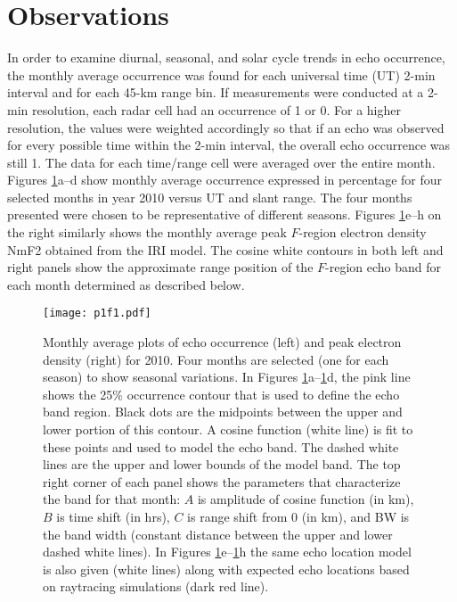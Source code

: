 \section{Observations}
\label{Sec:Obs}

In order to examine diurnal, seasonal, and solar cycle trends in echo occurrence, the monthly average occurrence was found for each universal time (UT) 2-min interval and for each 45-km range bin. If measurements were conducted at a 2-min resolution, each radar cell had an occurrence of 1 or 0. For a higher resolution, the values were weighted accordingly so that if an echo was observed for every possible time within the 2-min interval, the overall echo occurrence was still 1. The data for each time/range cell were averaged over the entire month. Figures \ref{fig:month_avg_occ}a--d show monthly average occurrence expressed in percentage for four selected months in year 2010 versus UT and slant range. The four months presented were chosen to be representative of different seasons. Figures \ref{fig:month_avg_occ}e--h on the right similarly shows the monthly average peak \(F\)-region electron density NmF2 obtained from the IRI model. The cosine white contours in both left and right panels show the approximate range position of the \(F\)-region echo band for each month determined as described below.
	
\begin{figure}
\texttt{[image: p1f1.pdf]}
\caption{Monthly average plots of echo occurrence (left) and peak electron density (right) for 2010.  Four months are selected (one for each season) to show seasonal variations. In Figures \ref{fig:month_avg_occ}a--\ref{fig:month_avg_occ}d,  the pink line shows the 25\% occurrence contour that is used to define the echo band region. Black dots are the midpoints between the upper and lower portion of this contour.  A cosine function (white line) is fit to these points and used to model the echo band. The dashed white lines are the upper and lower bounds of the model band. The top right corner of each panel shows the parameters that characterize the band for that month: \(A\) is amplitude of cosine function (in km), \(B\) is time shift (in hrs), \(C\) is range shift from 0 (in km), and BW is the band width (constant distance between the upper and lower dashed white lines).  In Figures \ref{fig:month_avg_occ}e--\ref{fig:month_avg_occ}h the same echo location model is also given (white lines) along with expected echo locations based on raytracing simulations (dark red line).}
\label{fig:month_avg_occ}
\end{figure}

